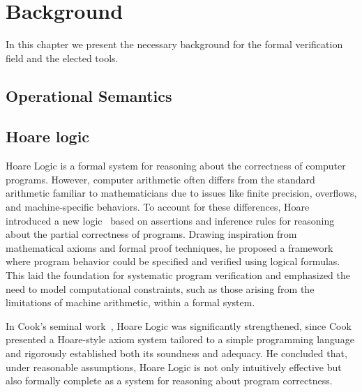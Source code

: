 
%


\chapter{Background}
\label{cha:Background}

In this chapter we present the necessary background for the formal verification field and the elected tools.

\section{Operational Semantics}
\label{sec:Operational_Semantics}



\section{Hoare logic}
\label{sec:Hoare_logic}

Hoare Logic is a formal system for reasoning about the correctness of computer programs. However, 
computer arithmetic often differs from the standard arithmetic familiar to mathematicians due to issues like finite 
precision, overflows, and machine-specific behaviors. To account for these differences, Hoare introduced a new logic~\cite{Hoare69}
based on assertions and inference rules for reasoning about the partial correctness of programs. Drawing inspiration 
from mathematical axioms and formal proof techniques, he proposed a framework where program behavior could be specified 
and verified using logical formulas. This laid the foundation for systematic program verification and emphasized the need 
to model computational constraints, such as those arising from the limitations of machine arithmetic, within a formal system.

In Cook's seminal work~\cite{0207005}, Hoare Logic was significantly strengthened, since Cook presented a Hoare-style axiom system 
tailored to a simple programming language and rigorously established both its soundness and adequacy. He concluded that, under 
reasonable assumptions, Hoare Logic is not only intuitively effective but also formally complete as a system for reasoning about 
program correctness.

